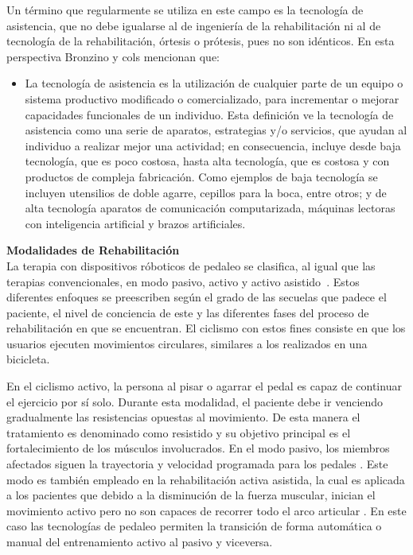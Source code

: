 Un término que regularmente se utiliza en este campo es la tecnología de asistencia, que no debe igualarse al de ingeniería de la rehabilitación ni al de tecnología de la rehabilitación, órtesis o prótesis, pues no son idénticos. En esta perspectiva Bronzino y cols \cite{enderle2012introduction} mencionan que:

\begin{itemize}
    \item  La tecnología de asistencia es la utilización de cualquier parte de un equipo o sistema productivo modificado o comercializado, para incrementar o mejorar capacidades funcionales de un individuo. Esta definición ve la tecnología de asistencia como una serie de aparatos, estrategias y/o servicios, que ayudan al individuo a realizar mejor una actividad; en consecuencia, incluye desde baja tecnología, que es poco costosa, hasta alta tecnología, que es costosa y con productos de compleja fabricación. Como ejemplos de baja tecnología se incluyen utensilios de doble agarre, cepillos para la boca, entre otros; y de alta tecnología aparatos de comunicación computarizada, máquinas lectoras con inteligencia artificial y brazos artificiales.
\end{itemize}

\textbf{Modalidades de Rehabilitación} \\ 
La terapia con dispositivos róboticos de pedaleo se clasifica, al igual que las terapias convencionales, en modo pasivo, activo y activo asistido~\cite{barclay2019effect}. Estos diferentes enfoques se preescriben según el grado de las secuelas que padece el paciente, el nivel de conciencia de este y las diferentes fases del proceso de rehabilitación en que se encuentran. El ciclismo con estos fines consiste en que los usuarios ejecuten movimientos circulares, similares a los realizados en una bicicleta.

En el ciclismo activo, la persona al pisar o agarrar el pedal es capaz de continuar el ejercicio por sí solo. Durante esta modalidad, el paciente debe ir venciendo gradualmente las resistencias opuestas al movimiento. De esta manera el tratamiento es denominado como resistido y su objetivo principal es el fortalecimiento de los músculos involucrados. En el modo pasivo, los miembros afectados siguen la trayectoria y velocidad programada para los pedales \cite{ferreira2020virtual}. Este modo es también empleado en la rehabilitación activa asistida, la cual es aplicada a los pacientes que debido a la disminución de la fuerza muscular, inician el movimiento activo pero no son capaces de recorrer todo el arco articular \cite{cruz2009guia}. En este caso las tecnologías de pedaleo permiten la transición de forma automática o manual del entrenamiento activo al pasivo y viceversa.

